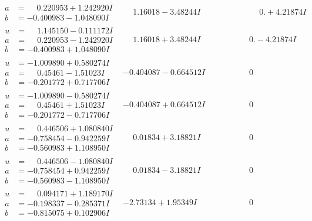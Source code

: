 \documentclass[1p]{elsarticle_modified}
\theoremstyle{definition}
\begin{document}
$$\begin{array}{c|c|c}
\begin{aligned}
a &= \phantom{-}0.220953 + 1.242920 I \\
b &= -0.400983 - 1.048090 I\end{aligned}
 & \phantom{-}1.16018 - 3.48244 I & \phantom{-0.000000 -}0. + 4.21874 I \\ \hline\begin{aligned}
u &= \phantom{-}1.145150 - 0.111172 I \\
a &= \phantom{-}0.220953 - 1.242920 I \\
b &= -0.400983 + 1.048090 I\end{aligned}
 & \phantom{-}1.16018 + 3.48244 I & \phantom{-0.000000 } 0. - 4.21874 I \\ \hline\begin{aligned}
u &= -1.009890 + 0.580274 I \\
a &= \phantom{-}0.45461 - 1.51023 I \\
b &= -0.201772 + 0.717706 I\end{aligned}
 & -0.404087 - 0.664512 I & \phantom{-0.000000 } 0 \\ \hline\begin{aligned}
u &= -1.009890 - 0.580274 I \\
a &= \phantom{-}0.45461 + 1.51023 I \\
b &= -0.201772 - 0.717706 I\end{aligned}
 & -0.404087 + 0.664512 I & \phantom{-0.000000 } 0 \\ \hline\begin{aligned}
u &= \phantom{-}0.446506 + 1.080840 I \\
a &= -0.758454 - 0.942259 I \\
b &= -0.560983 + 1.108950 I\end{aligned}
 & \phantom{-}0.01834 + 3.18821 I & \phantom{-0.000000 } 0 \\ \hline\begin{aligned}
u &= \phantom{-}0.446506 - 1.080840 I \\
a &= -0.758454 + 0.942259 I \\
b &= -0.560983 - 1.108950 I\end{aligned}
 & \phantom{-}0.01834 - 3.18821 I & \phantom{-0.000000 } 0 \\ \hline\begin{aligned}
u &= \phantom{-}0.094171 + 1.189170 I \\
a &= -0.198337 - 0.285371 I \\
b &= -0.815075 + 0.102906 I\end{aligned}
 & -2.73134 + 1.95349 I & \phantom{-0.000000 } 0 \\ \hline\begin{aligned}

\end{aligned}
\end{array}$$
\end{document}
